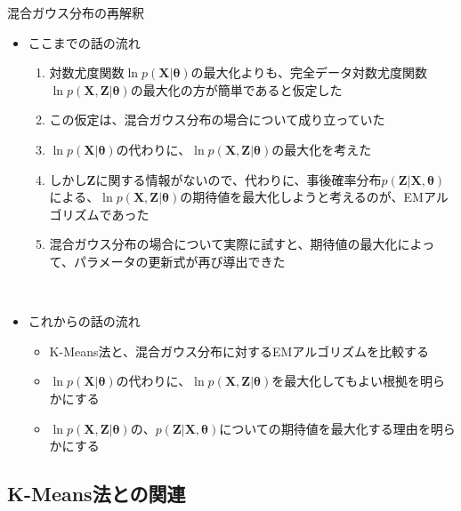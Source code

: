 \documentclass[dvipdfmx,notheorems,t]{beamer}
\begin{document}
\begin{frame}{混合ガウス分布の再解釈}

\begin{itemize}
	\item ここまでの話の流れ
	\begin{enumerate}
		\item 対数尤度関数$\ln p(\bm{X} | \bm{\theta})$の最大化よりも、完全データ対数尤度関数$\ln p(\bm{X}, \bm{Z} | \bm{\theta})$の最大化の方が簡単であると仮定した
		\newline
		\item この仮定は、混合ガウス分布の場合について成り立っていた
		\newline
		\item $\ln p(\bm{X} | \bm{\theta})$の代わりに、$\ln p(\bm{X}, \bm{Z} | \bm{\theta})$の最大化を考えた
		\newline
		\item しかし$\bm{Z}$に関する情報がないので、代わりに、事後確率分布$p(\bm{Z} | \bm{X}, \bm{\theta})$による、$\ln p(\bm{X}, \bm{Z} | \bm{\theta})$の\alert{期待値を最大化}しようと考えるのが、EMアルゴリズムであった
		\newline
		\item 混合ガウス分布の場合について実際に試すと、期待値の最大化によって、パラメータの更新式が再び導出できた
	\end{enumerate} \
	
	\framebreak
	
	\item これからの話の流れ
	\begin{itemize}
		\item K-Means法と、混合ガウス分布に対するEMアルゴリズムを比較する
		\item $\ln p(\bm{X} | \bm{\theta})$の代わりに、\color{red}$\ln p(\bm{X}, \bm{Z} | \bm{\theta})$を最大化してもよい根拠\normalcolor を明らかにする
		\item $\ln p(\bm{X}, \bm{Z} | \bm{\theta})$の、$p(\bm{Z} | \bm{X}, \bm{\theta})$についての\alert{期待値を最大化する理由}を明らかにする
	\end{itemize}
\end{itemize}

\end{frame}

\subsection{K-Means法との関連}
\end{document}
